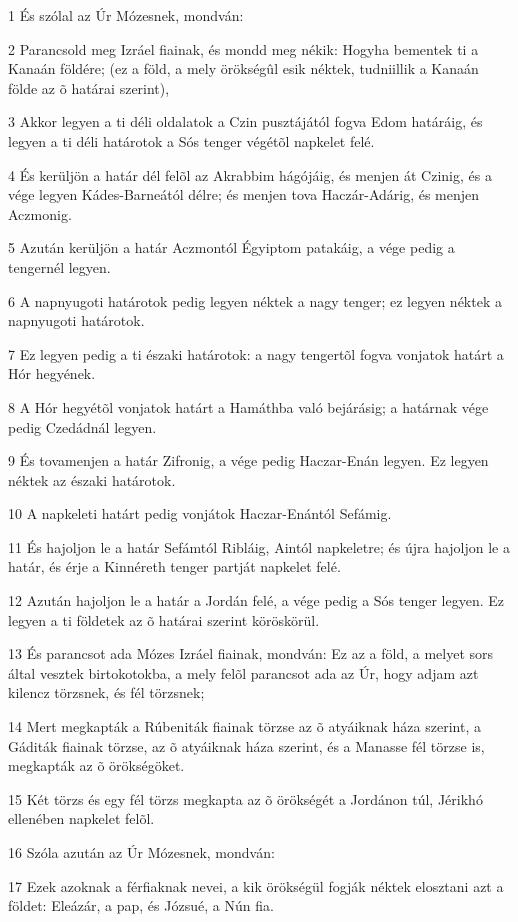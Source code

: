 \par 1 És szólal az Úr Mózesnek, mondván:
\par 2 Parancsold meg Izráel fiainak, és mondd meg nékik: Hogyha bementek ti a Kanaán földére; (ez a föld, a mely örökségûl esik néktek, tudniillik a Kanaán földe az õ határai szerint),
\par 3 Akkor legyen a ti déli oldalatok a Czin pusztájától fogva Edom határáig, és legyen a ti déli határotok a Sós tenger végétõl napkelet felé.
\par 4 És kerüljön a határ dél felõl az Akrabbim hágójáig, és menjen át Czinig, és a vége legyen Kádes-Barneától délre; és menjen tova Haczár-Adárig, és menjen Aczmonig.
\par 5 Azután kerüljön a határ Aczmontól Égyiptom patakáig, a vége pedig a tengernél legyen.
\par 6 A napnyugoti határotok pedig legyen néktek a nagy tenger; ez legyen néktek a napnyugoti határotok.
\par 7 Ez legyen pedig a ti északi határotok: a nagy tengertõl fogva vonjatok határt a Hór hegyének.
\par 8 A Hór hegyétõl vonjatok határt a Hamáthba való bejárásig; a határnak vége pedig Czedádnál legyen.
\par 9 És tovamenjen a határ Zifronig, a vége pedig Haczar-Enán legyen. Ez legyen néktek az északi határotok.
\par 10 A napkeleti határt pedig vonjátok Haczar-Enántól Sefámig.
\par 11 És hajoljon le a határ Sefámtól Ribláig, Aintól napkeletre; és újra hajoljon le a határ, és érje a Kinnéreth tenger partját napkelet felé.
\par 12 Azután hajoljon le a határ a Jordán felé, a vége pedig a Sós tenger legyen. Ez legyen a ti földetek az õ határai szerint köröskörül.
\par 13 És parancsot ada Mózes Izráel fiainak, mondván: Ez az a föld, a melyet sors által vesztek birtokotokba, a mely felõl parancsot ada az Úr, hogy adjam azt kilencz törzsnek, és fél törzsnek;
\par 14 Mert megkapták a Rúbeniták fiainak törzse az õ atyáiknak háza szerint, a Gáditák fiainak törzse, az õ atyáiknak háza szerint, és a Manasse fél törzse is, megkapták az õ örökségöket.
\par 15 Két törzs és egy fél törzs megkapta az õ örökségét a Jordánon túl, Jérikhó ellenében napkelet felõl.
\par 16 Szóla azután az Úr Mózesnek, mondván:
\par 17 Ezek azoknak a férfiaknak nevei, a kik örökségül fogják néktek elosztani azt a földet: Eleázár, a pap, és Józsué, a Nún fia.
